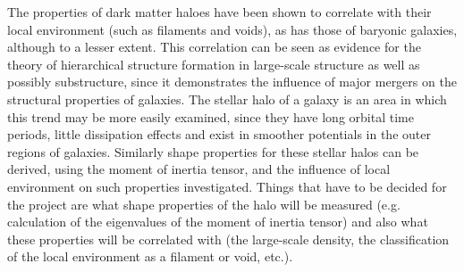 The properties of dark matter haloes have been shown to correlate with their local environment (such as filaments and voids), as has those of baryonic galaxies, although to a lesser extent. This correlation can be seen as evidence for the theory of hierarchical structure formation in large-scale structure as well as possibly substructure, since it demonstrates the influence of major mergers on the structural properties of galaxies. The stellar halo of a galaxy is an area in which this trend may be more easily examined, since they have long orbital time periods, little dissipation effects and exist in smoother potentials in the outer regions of galaxies. Similarly shape properties for these stellar halos can be derived, using the moment of inertia tensor, and the influence of local environment on such properties investigated.
Things that have to be decided for the project are what shape properties of the halo will be measured (e.g. calculation of the eigenvalues of the moment of inertia tensor) and also what these properties will be correlated with (the large-scale density, the classification of the local environment as a filament or void, etc.).
